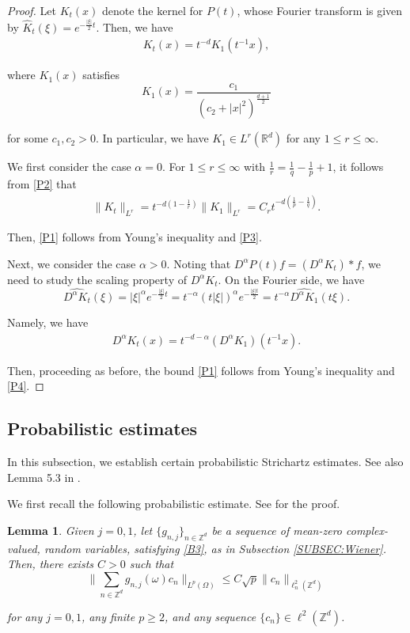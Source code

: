 \documentclass[letterpaper, 11pt,  reqno]{amsart}
\newtheorem{lemma}[theorem]{Lemma}
\newcommand{\1}{\hspace{0.5mm}\text{I}\hspace{0.2mm}}
\newcommand{\noi}{\noindent}
\newcommand{\Z}{\mathbb{Z}}
\newcommand{\R}{\mathbb{R}}
\newcommand{\al}{\alpha}
\newcommand{\ft}{\widehat}
\renewcommand{\l}{\ell}
\numberwithin{equation}{section}
\numberwithin{theorem}{section}
\begin{document}
\begin{proof}
Let $K_t(x)$ denote the kernel for $P(t)$, whose Fourier transform is given by 
$\ft K_t(\xi) = e^{-\frac{|\xi|}{2}t}$.
Then, we have 
\begin{align}
 K_t(x) = t^{-d} K_1(t^{-1}x), 
 \label{P2}
\end{align}

\noi
where $K_1(x)$ satisfies
\[ K_1(x) = \frac{c_1}{(c_2 + |x|^2)^{\frac{d + 1}{2}}}\]

\noi
for some $c_1, c_2 > 0$.
In particular, we have $K_1 \in L^r(\R^d)$ for any $1\leq r \leq \infty$.

We first consider the case $\al = 0$.
For $1 \leq r \leq \infty$ with $\frac{1}{r} = \frac{1}{q} - \frac{1}{p} + 1$, 
it follows from \eqref{P2} that 
\begin{align}
\| K_t\|_{L^r} =t^{-d (1 - \frac{1}{r})} 
\| K_1\|_{L^r}
= C_r t^{-d (\frac{1}{p} - \frac{1}{q})}.
\label{P3}
\end{align}

\noi
Then, \eqref{P1} follows from Young's inequality and \eqref{P3}.

Next, we consider the case $\al > 0$.
Noting that 
$D^\al P(t) f = (D^\al K_t) *f$, we need to study the scaling property of $D^\al K_t$.
On the Fourier side, we have
\[ \ft{D^\al K_t}(\xi) = |\xi|^{\al} e^{-\frac{|\xi|}{2}t}
= t^{-\al}  (t |\xi|)^{\al} e^{-\frac{|\xi|t}{2}}
= t^{-\al} \ft {D^\al K_1}(t \xi).
\]

\noi
Namely, we have 
\begin{align}
D^\al K_t(x)  = t^{-d-\al} (D^\al K_1)(t^{-1}x).
\label{P4}
\end{align}

\noi
Then, proceeding as before, 
the bound \eqref{P1} follows from Young's inequality and \eqref{P4}.
\end{proof}



\subsection{Probabilistic estimates}




In this subsection, we establish certain probabilistic Strichartz estimates.
See also Lemma 5.3 in \cite{KC}.


We first  recall the following probabilistic estimate. See \cite{BT1} for the proof.

\begin{lemma} \label{LEM:R1}
Given $j = 0, 1$,
let $\{g_{n, j}\}_{n\in \Z^d}$ be a sequence of mean-zero complex-valued,
 random variables, 
 satisfying  
 \eqref{B3}, as in Subsection \ref{SUBSEC:Wiener}.
   Then, there exists $C>0$ such that
\[ \bigg\| \sum_{n \in \Z^d} g_{n, j}(\omega) c_n\bigg\|_{L^p(\Omega)}
\leq C \sqrt{p} \| c_n\|_{\l^2_n(\Z^d)}\]

\noi
for any $j = 0, 1$, any finite  $p \geq 2$,  and any sequence $\{c_n\} \in \l^2(\Z^d)$.
\end{lemma}
\end{document}
